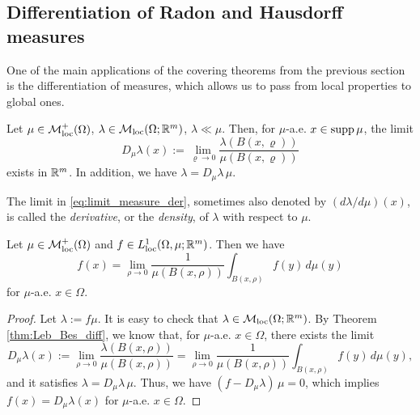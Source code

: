 \subsection{Differentiation of Radon and Hausdorff measures}

One of the main applications of the covering theorems from the previous section is the differentiation of measures, which allows us to pass from local properties to global ones.

\begin{theorem} \label{thm:Leb_Bes_diff}
Let $\mu \in \mathcal{M}^+_{\rm loc}(\Omega)$, $\lambda \in
\mathcal{M}_{\rm loc}(\Omega;\mathbb{R}^m)$, $\lambda \ll \mu$. Then, for $\mu$-a.e. $x \in
\operatorname{supp} \mu$, the limit 
\begin{equation} \label{eq:limit_measure_der}
D_{\mu}\lambda(x) := \lim_{\varrho \to 0} \frac{\lambda(B(x,\varrho))}{\mu(B(x,\varrho))}
\end{equation}
exists in $\mathbb{R}^m$. In addition, we have $\lambda = D_{\mu}\lambda \, \mu$.
\end{theorem}

The limit in \eqref{eq:limit_measure_der}, sometimes also denoted by $(d\lambda/d\mu)(x)$, is called the {\em derivative}, or the {\em density}, of $\lambda$ with respect to $\mu$. 

\begin{corollary}\label{cor:Leb_diff}
Let $\mu \in \mathcal{M}^+_{\rm loc}(\Omega)$ and $f \in L^{1}_{\rm loc}(\Omega, \mu; \mathbb{R}^{m})$. Then we have
\begin{equation*}
f(x) = \lim_{\rho \to 0} \frac{1}{\mu(B(x,\rho))}\int_{B(x, \rho)} f(y) \, d \mu(y)
\end{equation*} 
for $\mu$-a.e. $x \in \Omega$.
\end{corollary}
\begin{proof}
Let $\lambda := f \mu$. It is easy to check that $\lambda \in \mathcal{M}_{\rm loc}(\Omega; \mathbb{R}^{m})$.
By Theorem \ref{thm:Leb_Bes_diff}, we know that, for $\mu$-a.e. $x \in \Omega$, there exists the limit 
\begin{equation*}
D_{\mu}\lambda(x) := \lim_{\rho \to 0} \frac{\lambda(B(x,\rho))}{\mu(B(x,\rho))} = \lim_{\rho \to 0} \frac{1}{\mu(B(x,\rho))}\int_{B(x, \rho)} f(y) \, d \mu(y),
\end{equation*}
and it satisfies $\lambda = D_{\mu}\lambda \, \mu$. Thus, we have $(f - D_{\mu}\lambda) \, \mu = 0$, which implies $f(x) = D_{\mu}\lambda(x)$ for $\mu$-a.e. $x \in \Omega$.
\end{proof}

